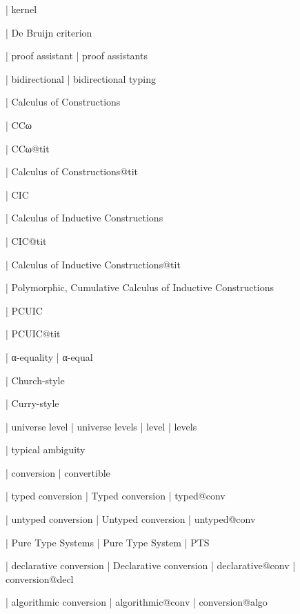   | kernel

  | De Bruijn criterion

  | proof assistant
  | proof assistants

  | bidirectional
  | bidirectional typing



  | Calculus of Constructions

  | CCω

  | CCω@tit

  | Calculus of Constructions@tit

  | CIC

  | Calculus of Inductive Constructions

  | CIC@tit

  | Calculus of Inductive Constructions@tit

  | Polymorphic, Cumulative Calculus of Inductive Constructions

  | PCUIC

  | PCUIC@tit

  | α-equality
  | α-equal 

  | Church-style

  | Curry-style

  | universe level
  | universe levels
  | level
  | levels

  | typical ambiguity


  | conversion
  | convertible

  | typed conversion
  | Typed conversion
  | typed@conv

  | untyped conversion
  | Untyped conversion
  | untyped@conv

  | Pure Type Systems
  | Pure Type System
  | PTS

  | declarative conversion
  | Declarative conversion
  | declarative@conv
  | conversion@decl

  | algorithmic conversion
  | algorithmic@conv
  | conversion@algo


